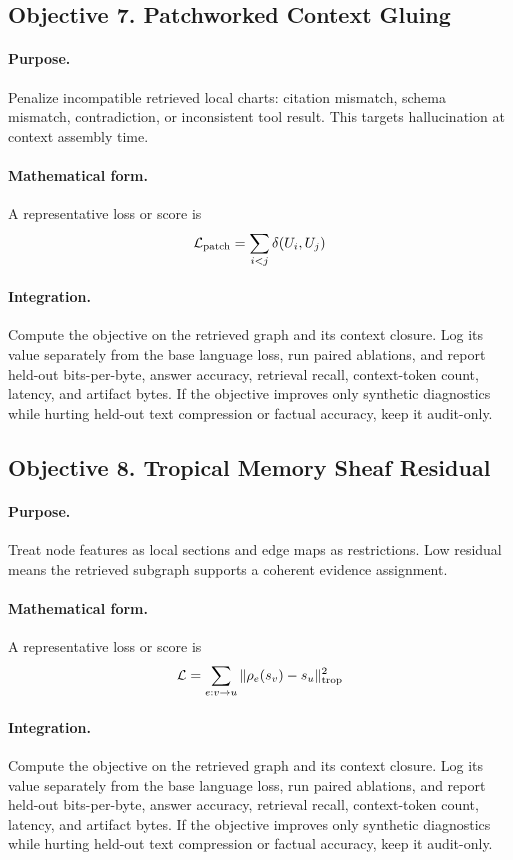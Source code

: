 \documentclass[11pt]{article}
\theoremstyle{definition}
\theoremstyle{remark}
\begin{document}
\subsection{Objective 7. Patchworked Context Gluing}
\paragraph{Purpose.} Penalize incompatible retrieved local charts: citation mismatch, schema mismatch, contradiction, or inconsistent tool result. This targets hallucination at context assembly time.

\paragraph{Mathematical form.} A representative loss or score is
\[
    \mathcal L_{\rm patch}=\sum_{i<j}\delta(U_i,U_j)
\]

\paragraph{Integration.} Compute the objective on the retrieved graph and its context closure. Log its value separately from the base language loss, run paired ablations, and report held-out bits-per-byte, answer accuracy, retrieval recall, context-token count, latency, and artifact bytes. If the objective improves only synthetic diagnostics while hurting held-out text compression or factual accuracy, keep it audit-only.


\subsection{Objective 8. Tropical Memory Sheaf Residual}
\paragraph{Purpose.} Treat node features as local sections and edge maps as restrictions. Low residual means the retrieved subgraph supports a coherent evidence assignment.

\paragraph{Mathematical form.} A representative loss or score is
\[
    \mathcal L=\sum_{e:v\to u}\|\rho_e(s_v)-s_u\|_{\rm trop}^2
\]

\paragraph{Integration.} Compute the objective on the retrieved graph and its context closure. Log its value separately from the base language loss, run paired ablations, and report held-out bits-per-byte, answer accuracy, retrieval recall, context-token count, latency, and artifact bytes. If the objective improves only synthetic diagnostics while hurting held-out text compression or factual accuracy, keep it audit-only.
\end{document}
